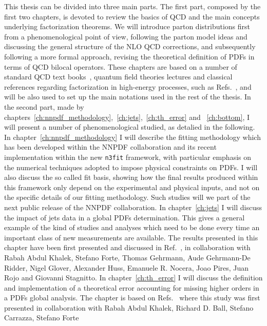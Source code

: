 This thesis can be divided into three main parts. The first part, composed by the first two chapters, 
is devoted to review the basics of QCD and the main concepts underlying factorization theorems. 
We will introduce parton distributions first from a phenomenological point of view, following the parton model ideas and
discussing the general structure of the NLO QCD corrections, and subsequently following a more formal approach,
revising the theoretical definition of PDFs in terms of QCD bilocal operators.
These chapters are based on a number of standard QCD text books~\cite{Ellis:1991qj,Muta:2010xua,Collins:1984xc},
quantum field theories lectures and classical references regarding factorization in high-energy processes,
such as Refs.~\cite{Collins:1980ui, Collins:1981uw, Collins:1989gx}, and will be also used to set up the 
main notations used in the rest of the thesis.
%
In the second part, made by chapters~\ref{ch:nnpdf_methodology},~\ref{ch:jets},~\ref{ch:th_error} and ~\ref{ch:bottom}, 
I will present a number of phenomenological studied, as detalied in the following.
%
In chapter~\ref{ch:nnpdf_methodology} I will describe the fitting methodology which has been developed
within the NNPDF collaboration and its recent implementation within the new {\tt n3fit} framework, 
with particular emphasis on the numerical techniques adopted to impose physical constraints on PDFs.
I will also discuss the so called fit basis, showing how
the final results produced within this framework only depend on the experimental and physical inputs, 
and not on the specific details of our fitting methodology. Such studies will we part of the next public release
of the NNPDF collaboration.
%
In chapter~\ref{ch:jets} I will discuss the impact of jets data in a global PDFs determination. 
This gives a general example of the kind of studies and analyses which need to be done every time an important class of new measurements
are available. The results presented in this chapter have been first presented and discussed in Ref.~\cite{AbdulKhalek:2020jut},
in collaboration with Rabah Abdul Khalek, Stefano Forte, Thomas Gehrmann, Aude Gehrmann-De Ridder,
Nigel Glover, Alexander Huss, Emanuele R. Nocera, Joao Pires, Juan Rojo and Giovanni Stagnitto.
In chapter~\ref{ch:th_error} I will discuss the definition and implementation of a theoretical error 
accounting for missing higher orders in a PDFs global analysis. 
The chapter is based on Refs.~\cite{AbdulKhalek:2019bux,AbdulKhalek:2019ihb} where this
study was first presented in collaboration with Rabah Abdul Khalek, Richard D. Ball, Stefano Carrazza, Stefano Forte
